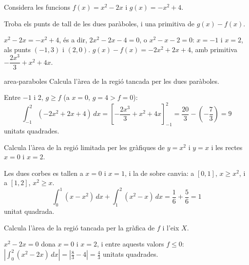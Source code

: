 Considera les funcions $f(x)=x^2-2x$ i $g(x)=-x^2+4$.

\begin{apartats}

Troba els punts de tall de les dues paràboles, i una primitiva de $g(x)-f(x)$.

\begin{solucio}
$x^2-2x=-x^2+4$, és a dir, $2x^2-2x-4=0$, o $x^2-x-2=0$: $x=-1$ i $x=2$, als punts $(-1,3)$ i $(2,0)$.
$g(x)-f(x)=-2x^2+2x+4$, amb primitiva $-\dfrac{2x^3}3+x^2+4x$.
\end{solucio}

\begin{tria}{area-paraboles}
Calcula l'àrea de la regió tancada per les dues paràboles.

\begin{solucio}
Entre $-1$ i 2, $g\ge f$ (a $x=0$, $g=4>f=0$):
\[
\int_{-1}^2(-2x^2+2x+4)\,dx=\left[-\frac{2x^3}3+x^2+4x\right]_{-1}^2=\frac{20}3-\left(-\frac73\right)=9
\]
unitats quadrades.
\end{solucio}

Calcula l'àrea de la regió limitada per les gràfiques de $y=x^2$ i $y=x$ i les rectes $x=0$ i $x=2$.

\begin{solucio}
Les dues corbes es tallen a $x=0$ i $x=1$, i la de sobre canvia: a $[0,1]$, $x\ge x^2$, i a $[1,2]$,
$x^2\ge x$.
\[
\int_0^1(x-x^2)\,dx+\int_1^2(x^2-x)\,dx=\frac16+\frac56=1
\]
unitat quadrada.
\end{solucio}
\end{tria}

\begin{nomesllarg}
Calcula l'àrea de la regió tancada per la gràfica de $f$ i l'eix $X$.

\begin{solucio}
$x^2-2x=0$ dona $x=0$ i $x=2$, i entre aquests valors $f\le0$:
$\left|\displaystyle\int_0^2(x^2-2x)\,dx\right|=\left|\frac83-4\right|=\frac43$ unitats quadrades.
\end{solucio}
\end{nomesllarg}

\end{apartats}
